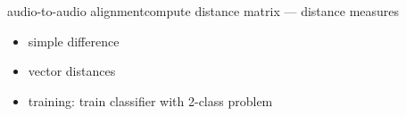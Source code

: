         \begin{frame}{audio-to-audio alignment}{compute distance matrix --- distance measures}
            \begin{itemize}
                \item	simple difference
                \item<2->	vector distances
                \item<3->	training: train classifier with 2-class problem 
            \end{itemize}
        \end{frame}
        
